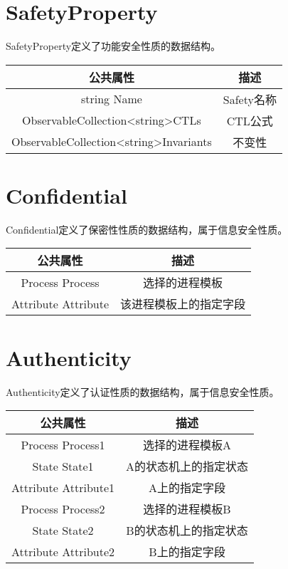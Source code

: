 \section{SafetyProperty}
SafetyProperty定义了功能安全性质的数据结构。
\begin{table}[h]
	\centering
	\begin{tabular}{|c|c|}
		\hline
		\textbf{公共属性}                                                & \textbf{描述} \\ \hline
		string Name                                                  & Safety名称    \\ \hline
		ObservableCollection\textless{}string\textgreater CTLs       & CTL公式       \\ \hline
		ObservableCollection\textless{}string\textgreater Invariants & 不变性         \\ \hline
	\end{tabular}
\end{table}

\section{Confidential}
Confidential定义了保密性性质的数据结构，属于信息安全性质。
\begin{table}[h]
	\centering
	\begin{tabular}{|c|c|}
		\hline
		\textbf{公共属性}       & \textbf{描述} \\ \hline
		Process Process     & 选择的进程模板     \\ \hline
		Attribute Attribute & 该进程模板上的指定字段       \\ \hline
	\end{tabular}
\end{table}

\section{Authenticity}
Authenticity定义了认证性质的数据结构，属于信息安全性质。
\begin{table}[h]
	\centering
	\begin{tabular}{|c|c|}
		\hline
		\textbf{公共属性}        & \textbf{描述} \\ \hline
		Process Process1     & 选择的进程模板A    \\ \hline
		State State1         & A的状态机上的指定状态 \\ \hline
		Attribute Attribute1 & A上的指定字段     \\ \hline
		Process Process2     & 选择的进程模板B    \\ \hline
		State State2         & B的状态机上的指定状态 \\ \hline
		Attribute Attribute2 & B上的指定字段     \\ \hline
	\end{tabular}
\end{table}

